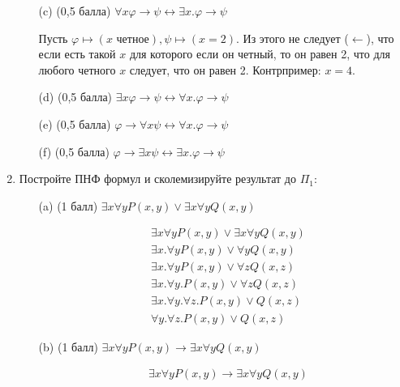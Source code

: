 \begin{enumerate}
\begin{itemize}
        \item[(c)] (0,5 балла) $\forall x\varphi \rightarrow \psi \leftrightarrow \exists x. \varphi \rightarrow \psi$
        \begin{solution}
            Пусть $\varphi \mapsto (x \text{ четное}), \psi \mapsto (x = 2)$. Из этого не следует ($\leftarrow$), что если есть такой $x$ для которого если он четный, то он равен 2, что для любого четного $x$ следует, что он равен 2. Контрпример: $x = 4$.
        \end{solution}
        \item[(d)] (0,5 балла) $\exists x\varphi \rightarrow \psi \leftrightarrow \forall x. \varphi \rightarrow \psi$
        \item[(e)] (0,5 балла) $\varphi \rightarrow \forall x\psi \leftrightarrow \forall x. \varphi \rightarrow \psi$
        \item[(f)] (0,5 балла) $\varphi \rightarrow \exists x\psi \leftrightarrow \exists x. \varphi \rightarrow \psi$
    \end{itemize}
    \item Постройте ПНФ формул и сколемизируйте результат до $\Pi_1$:
    \begin{itemize}
        \item[(a)] (1 балл) $\exists x\forall y P(x, y) \lor \exists x\forall y Q(x, y)$
        \begin{solution}
            \begin{align*}
                &\exists x\forall y P(x, y) \lor \exists x\forall y Q(x, y) \\
                &\exists x . \forall y P(x, y) \lor \forall y Q(x, y) \\
                &\exists x . \forall y P(x, y) \lor \forall z Q(x, z) \\
                &\exists x . \forall y. P(x, y) \lor \forall z Q(x, z) \\
                &\exists x . \forall y. \forall z . P(x, y) \lor Q(x, z) \\
                &\forall y. \forall z . P(x, y) \lor Q(x, z)
            \end{align*}
        \end{solution}
        \item[(b)] (1 балл) $\exists x\forall y P(x, y) \rightarrow \exists x\forall y Q(x, y)$
        \begin{solution}
            \begin{align*}
                &\exists x\forall y P(x, y) \rightarrow \exists x\forall y Q(x, y) \\

\end{align*}
\end{solution}
\end{itemize}
\end{enumerate}
